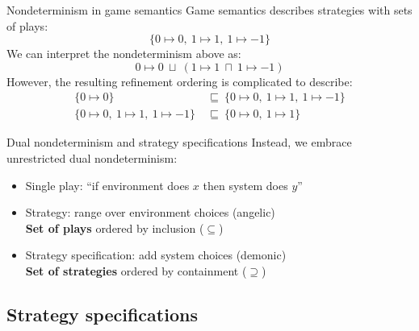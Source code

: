 \documentclass[aspectratio=141]{beamer}
\begin{document}
\begin{frame}{Nondeterminism in game semantics} %
  Game semantics describes strategies with sets of plays:
  \[
      \{ 0 \mapsto 0, \: 1 \mapsto 1, \: 1 \mapsto -1 \}
  \]
  \pause
  We can interpret the nondeterminism above as:
  \[
      0 \mapsto 0 \:\sqcup\: (1 \mapsto 1 \:\sqcap\: 1 \mapsto -1)
  \]
  \pause
  However, the resulting refinement ordering is complicated to describe:
  \begin{align*}
    \{ 0 \mapsto 0 \}
    \: &\sqsubseteq \:
    \{ 0 \mapsto 0, \: 1 \mapsto 1, \: 1 \mapsto -1 \}
    \\ 
    \{ 0 \mapsto 0, \: 1 \mapsto 1, \: 1 \mapsto -1 \}
    \: &\sqsubseteq \:
    \{ 0 \mapsto 0, \: 1 \mapsto 1 \}
  \end{align*}
\end{frame}

\begin{frame}{Dual nondeterminism and strategy specifications} %
Instead, we embrace unrestricted dual nondeterminism:
\begin{itemize}[<+->]
  \item Single play: ``if environment does $x$ then system does $y$''
  \item Strategy: range over environment choices (angelic) \\
    \textbf{Set of plays} ordered by inclusion ($\subseteq$)
  \item Strategy specification: add system choices (demonic) \\
    \textbf{Set of strategies} ordered by containment ($\supseteq$)
\end{itemize}
\end{frame}

\subsection{Strategy specifications}
\end{document}
